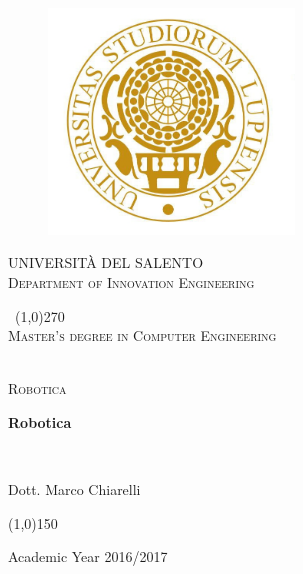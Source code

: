 \documentclass[11 pt,a4paper,twoside,openany]{book}
\begin{document}
\pagestyle{fancy}
\fancyhead{}
\fancyfoot{}
\fancyfoot[R]{\thepage}
\renewcommand{\headrulewidth}{0pt}
\renewcommand{\footrulewidth}{0.1pt}

\newpage	
\begin{titlepage}
\begin{center}
	
\begin{figure}
	\centering
	\includegraphics[height=6cm]{unigold.jpg}
\end{figure}		

\begin{center}
\begin{LARGE}
	\textsc{UNIVERSIT\`A DEL SALENTO}\\
	[0.2cm]
	\textsc{Department of Innovation Engineering}
\end{LARGE}
\end{center}	
	
	\
	\line(1,0){270} \\
	[0.25cm]
	
	\textsc{Master's degree in Computer Engineering}\
	
	\textsl{}\\	
	[1cm]
	\textsc{Robotica}\
	
	\bigskip 
	\huge{\bfseries Robotica}\

	
	\bigskip
	\textsl{}\\
	[2cm]
	


\begin{LARGE}
	
	Dott. Marco Chiarelli
	
\end{LARGE}

\vspace{5cm}
	
\line(1,0){150} \\
\begin{small}
	Academic Year 2016/2017 \\
\end{small}
\end{center}
\end{titlepage}
\end{document}
